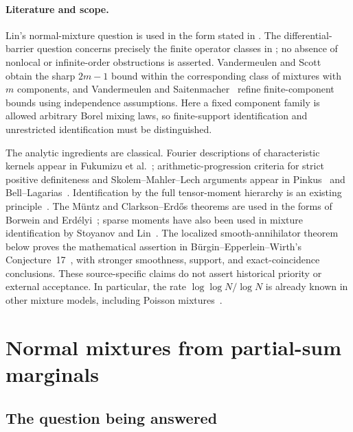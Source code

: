 \documentclass[11pt,letterpaper]{article}
\theoremstyle{definition}
\theoremstyle{remark}
\newcommand{\1}{\mathbf 1}
\begin{document}
\paragraph{Literature and scope.}
Lin's normal-mixture question is used in the form stated in
\cite[Section~2.6]{Lin2015}. The differential-barrier question
concerns precisely the finite operator classes in
\cite[Definitions~1 and~4]{LeBarilettoRinaldoHo2026}; no absence of
nonlocal or infinite-order obstructions is asserted.
Vandermeulen and Scott~\cite{VandermeulenScott2015} obtain the sharp
$2m-1$ bound within the corresponding class of mixtures with $m$
components, and Vandermeulen and Saitenmacher~\cite{VandermeulenSaitenmacher2022}
refine finite-component bounds using independence assumptions.
Here a fixed component family is allowed arbitrary Borel mixing laws,
so finite-support identification and unrestricted identification
must be distinguished.

The analytic ingredients are classical. Fourier descriptions of
characteristic kernels appear in Fukumizu et
al.~\cite{Fukumizu2008}; arithmetic-progression criteria for strict
positive definiteness and Skolem--Mahler--Lech arguments appear in
Pinkus~\cite[Section~3]{Pinkus2004} and
Bell--Lagarias~\cite[Theorem~1.3]{BellLagarias2015}.
Identification by the full tensor-moment hierarchy is an existing
principle~\cite{Bonnier2023}. The M\"untz and Clarkson--Erd\H{o}s
theorems are used in the forms of Borwein and
Erd\'elyi~\cite[Theorems~3.1--3.2]{BorweinErdelyi1995}; sparse
moments have also been used in mixture identification by Stoyanov and
Lin~\cite{StoyanovLin2011}.
The localized smooth-annihilator theorem below proves the mathematical
assertion in B\"urgin--Epperlein--Wirth's
Conjecture~17~\cite{BurginEpperleinWirth2022}, with stronger
smoothness, support, and exact-coincidence conclusions.
These source-specific claims do not assert historical priority or
external acceptance. In particular, the rate
$\log\log N/\log N$ is already known in other mixture models,
including Poisson mixtures~\cite{MiaoEtAl2024}.



\section{Normal mixtures from partial-sum marginals}
\label{p09:sec:normal-resolution}

\subsection{The question being answered}
\end{document}
